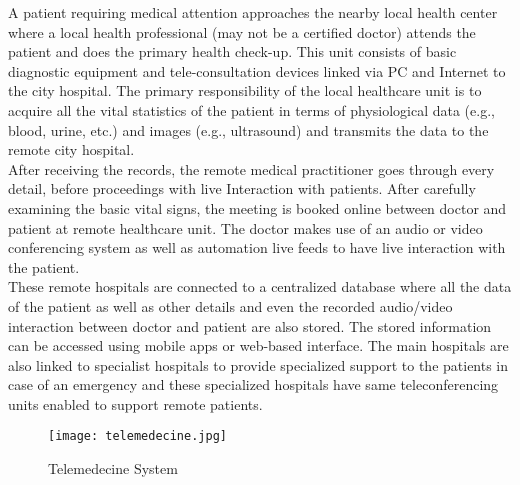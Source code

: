 \documentclass[12pt]{article}
\begin{document}
A patient requiring medical attention approaches the nearby local health center where a local health professional (may not be a certified doctor) attends the patient and does the primary health check-up. This unit consists of basic diagnostic equipment and tele-consultation devices linked via PC and Internet to the city hospital. The primary responsibility of the local healthcare unit is to acquire all the vital statistics of the patient in terms of physiological data (e.g., blood, urine, etc.) and images (e.g., ultrasound) and transmits the data to the remote city hospital.\newline\\
After receiving the records, the remote medical practitioner goes through every detail, before proceedings with live Interaction with patients. After carefully examining the basic vital signs, the meeting is booked online between doctor and patient at remote healthcare unit. The doctor makes use of an audio or video conferencing system as well as automation live feeds to have live interaction with the patient. \newline \\
 These remote hospitals are connected to a centralized database where all the data of the patient as well as other details and even the recorded audio/video interaction between doctor and patient are also stored. The stored information can be accessed using mobile apps or web-based interface. The main hospitals are also linked to specialist hospitals to provide specialized support to the patients in case of an emergency and these specialized hospitals have same teleconferencing units enabled to support remote patients.\newline \\
 \begin{figure}
    \centering
    \texttt{[image: telemedecine.jpg]}
    \caption{Telemedecine System}
 \end{figure}
 \newpage
\end{document}
